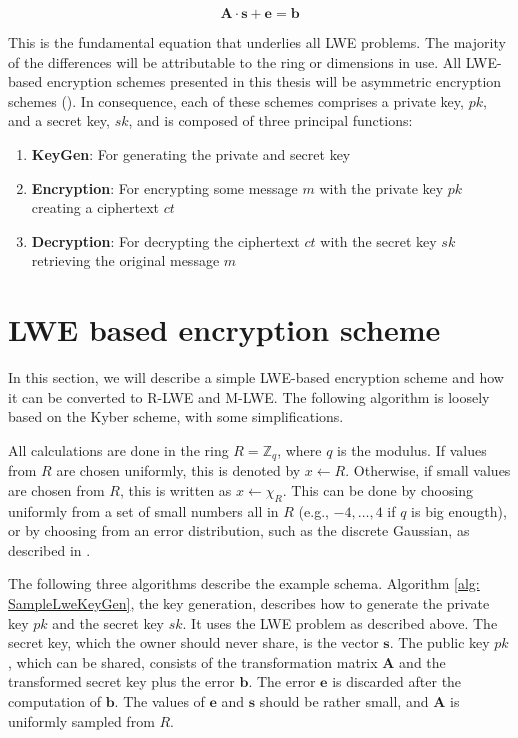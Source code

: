 $$\textbf{A}\cdot \textbf{s} + \textbf{e}= \textbf{b}$$

This is the fundamental equation that underlies all LWE problems. The majority of the differences will be attributable to the ring or dimensions in use. All LWE-based encryption schemes presented in this thesis will be asymmetric encryption schemes (\cite{Eckert2018}). In consequence, each of these schemes comprises a private key, $pk$, and a secret key, $sk$, and is composed of three principal functions:

\begin{enumerate}
  \item \textbf{KeyGen}: For generating the private and secret key
  \item \textbf{Encryption}: For encrypting some message $m$ with the private key $pk$ creating a ciphertext $ct$
  \item \textbf{Decryption}: For decrypting the ciphertext $ct$ with the secret key $sk$ retrieving the original message $m$
\end{enumerate}


\section{LWE based encryption scheme}
\label{sec:Lwe-Encryption}

In this section, we will describe a simple LWE-based encryption scheme and how it can be converted to R-LWE and M-LWE. The following algorithm is loosely based on the Kyber \cite{CyrstalsKyber} scheme, with some simplifications.

All calculations are done in the ring $R = \mathbb{Z}_q$, where $q$ is the modulus. If values from $R$ are chosen uniformly, this is denoted by $x \leftarrow R$. Otherwise, if small values are chosen from $R$, this is written as $x \leftarrow \chi_R$. This can be done by choosing uniformly from a set of small numbers all in $R$ (e.g., ${-4,\ldots, 4}$ if $q$ is big enougth), or by choosing from an error distribution, such as the discrete Gaussian, as described in \cite{Regev2005OnLL}.

The following three algorithms describe the example schema. Algorithm \ref{alg: SampleLweKeyGen}, the key generation, describes how to generate the private key $pk$ and the secret key $sk$. It uses the LWE problem as described above. The secret key, which the owner should never share, is the vector $\textbf{s}$. The public key $pk$, which can be shared, consists of the transformation matrix $\textbf{A}$ and the transformed secret key plus the error $\textbf{b}$. The error $\textbf{e}$ is discarded after the computation of $\textbf{b}$. The values of $\textbf{e}$ and $\textbf{s}$ should be rather small, and $\textbf{A}$ is uniformly sampled from $R$.


